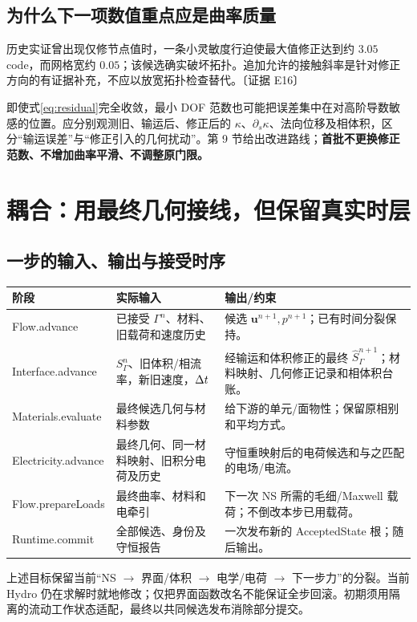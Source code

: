 \documentclass[UTF8,a4paper,11pt,fontset=fandol]{ctexart}
\newcommand{\ev}[1]{{\small\color{muted}〔证据 #1〕}}
\newcommand{\uu}{\bm u}\newcommand{\nn}{\bm n}\newcommand{\xx}{\bm x}
\begin{document}
\subsection{为什么下一项数值重点应是曲率质量}
历史实证曾出现仅修节点值时，一条小灵敏度行迫使最大值修正达到约 $3.05$ code，而网格宽约 $0.05$；该候选确实破坏拓扑。追加允许的接触斜率是针对修正方向的有证据补充，不应以放宽拓扑检查替代。\ev{E16}

即使式\eqref{eq:residual}完全收敛，最小 DOF 范数也可能把误差集中在对高阶导数敏感的位置。应分别观测旧、输运后、修正后的 $\kappa$、$\partial_s\kappa$、法向位移及相体积，区分“输运误差”与“修正引入的几何扰动”。第 9 节给出改进路线；\textbf{首批不更换修正范数、不增加曲率平滑、不调整原门限。}

\section{耦合：用最终几何接线，但保留真实时层}
\subsection{一步的输入、输出与接受时序}
\begin{longtable}{@{}P{.20\textwidth}P{.35\textwidth}P{.39\textwidth}@{}}
\toprule 阶段 & 实际输入 & 输出/约束\\\midrule\endhead
Flow.advance & 已接受 $\Gamma^n$、材料、旧载荷和速度历史 & 候选 $\uu^{n+1},p^{n+1}$；已有时间分裂保持。\\
Interface.advance & $S_\Gamma^n$、旧体积/相流率，新旧速度，$\Delta t$ & 经输运和体积修正的最终 $\widehat S_\Gamma^{n+1}$；材料映射、几何修正记录和相体积台账。\\
Materials.evaluate & 最终候选几何与材料参数 & 给下游的单元/面物性；保留原相别和平均方式。\\
Electricity.advance & 最终几何、同一材料映射、旧积分电荷及历史 & 守恒重映射后的电荷候选和与之匹配的电场/电流。\\
Flow.prepareLoads & 最终曲率、材料和电牵引 & 下一次 NS 所需的毛细/Maxwell 载荷；不倒改本步已用载荷。\\
Runtime.commit & 全部候选、身份及守恒报告 & 一次发布新的 AcceptedState 根；随后输出。\\
\bottomrule
\end{longtable}
上述目标保留当前“NS $\to$ 界面/体积 $\to$ 电学/电荷 $\to$ 下一步力”的分裂。当前 Hydro 仍在求解时就地修改；仅把界面函数改名不能保证全步回滚。初期须用隔离的流动工作状态适配，最终以共同候选发布消除部分提交。
\end{document}
